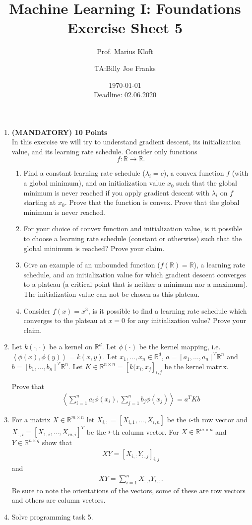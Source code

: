 \documentclass[]{scrartcl}
\author{Prof. Marius Kloft \and TA:Billy Joe Franks}
\title{Machine Learning I: Foundations \\ Exercise Sheet 5}
\date{\today\\Deadline: 02.06.2020}
\newcommand{\R}{\mathbb{R}}
\begin{document}
\maketitle

\begin{enumerate}

\item \textbf{(MANDATORY) 10 Points}\\ In this exercise we will try to understand gradient descent, its initialization value, and its learning rate schedule. Consider only functions \[f:\R \to \R.\]
\begin{enumerate}
\item Find a constant learning rate schedule ($\lambda_i=c$), a convex function $f$ (with a global minimum), and an initialization value $x_0$ such that the global minimum is never reached if you apply gradient descent with $\lambda_i$ on $f$ starting at $x_0$. Prove that the function is convex. Prove that the global minimum is never reached.
\item For your choice of convex function and initialization value, is it possible to choose a learning rate schedule (constant or otherwise) such that the global minimum is reached? Prove your claim.
\item Give an example of an unbounded function ($f(\R)=\R$), a learning rate schedule, and an initialization value for which gradient descent converges to a plateau (a critical point that is neither a minimum nor a maximum). The initialization value can not be chosen as this plateau.
\item Consider $f(x)=x^3$, is it possible to find a learning rate schedule which converges to the plateau at $x=0$ for any initialization value? Prove your claim.
\end{enumerate}

\item Let $k\left(\cdot,\cdot\right)$ be a kernel on $\R^d$. Let $\phi(\cdot)$ be the kernel mapping, i.e. $\left<\phi(x), \phi(y)\right> = k(x,y).$ Let $x_1,\ldots, x_n \in \R^d$, $a = \left[a_1,\ldots,a_n\right]^T \R^n$ and $b=  \left[b_1,\ldots,b_n\right]^T \R^n$. Let $K \in \R^{n\times n} = \left[k(x_i,x_j \right]_{i,j}$ be the kernel matrix.

	Prove that 
	\begin{eqnarray*}
		\left<\sum_{i= 1}^n a_i \phi(x_i),\sum_{j= 1}^n b_j \phi(x_j)  \right> = a^T K b
	\end{eqnarray*}

\item For a matrix $X \in \R^{m\times n}$ let $X_{i,:} = \left[X_{i,1},\ldots,X_{i,n}  \right]$ be the $i$-th row vector and $X_{:,i} =  \left[X_{1,i}, \ldots , X_{m,i} \right]^T$ be the $i$-th column vector. For $X \in \R^{m\times n}$ and $Y\in \R^{n\times q}$ show that
	\begin{eqnarray*}
		XY = \left[X_{i,:} Y_{:,j} \right]_{i,j}
	\end{eqnarray*}
	and
	\begin{eqnarray*}
		XY = \sum_{i=1}^n X_{:,i} Y_{i,:}.
	\end{eqnarray*}
	Be sure to note the orientations of the vectors, some of these are row vectors and others are column vectors.

\item Solve programming task 5.
\end{enumerate}
\end{document}
